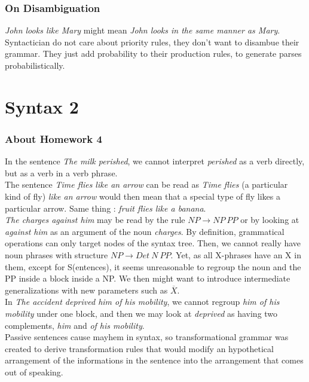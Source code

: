 \documentclass{cours}
\begin{document}
\section{On Disambiguation}
\textsl{John looks like Mary} might mean \textsl{John looks in the same manner as Mary}. Syntactician do not care about priority rules, they don't want to disambue their grammar. They just add probability to their production rules, to generate parses probabilistically. 

\part[Cours 5 : 26/10]{Syntax 2}
\section{About Homework 4}
In the sentence \textsl{The milk perished}, we cannot interpret \textsl{perished} as a verb directly, but as a verb in a verb phrase.\\
The sentence \textsl{Time flies like an arrow} can be read as \textsl{Time flies} (a particular kind of fly) \textsl{like an arrow} would then mean that a special type of fly likes a particular arrow. Same thing : \textsl{fruit flies like a banana}.\\
\textsl{The charges against him} may be read by the rule $NP \rightarrow NP \ PP$ or by looking at \textsl{against him} as an argument of the noun \textsl{charges}. 
By definition, grammatical operations can only target nodes of the syntax tree. Then, we cannot really have noun phrases with structure $NP \rightarrow Det\ N\ PP$. Yet, as all X-phrases have an X in them, except for S(entences), it seems unreasonable to regroup the noun and the PP inside a block inside a NP. We then might want to introduce intermediate generalizations with new parameters such as $\overline{X}$.\\
In \textsl{The accident deprived him of his mobility}, we cannot regroup \textsl{him of his mobility} under one block, and then we may look at \textsl{deprived} as having two complements, \textsl{him} and \textsl{of his mobility}.\\
Passive sentences cause mayhem in syntax, so transformational grammar was created to derive transformation rules that would modify an hypothetical arrangement of the informations in the sentence into the arrangement that comes out of speaking. 
\end{document}
